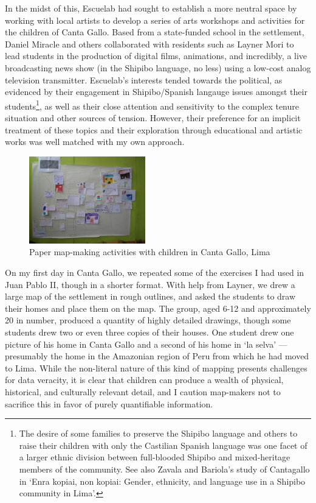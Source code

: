 \documentclass[11pt]{report}
\begin{document}
In the midst of this, Escuelab had sought to establish a more neutral space by working with local artists to develop a series of arts workshops and activities for the children of Canta Gallo. Based from a state-funded school in the settlement, Daniel Miracle and others collaborated with residents such as Layner Mori to lead students in the production of digital films, animations, and incredibly, a live broadcasting news show (in the Shipibo language, no less) using a low-cost analog television transmitter. Escuelab's interests tended towards the political, as evidenced by their engagement in Shipibo/Spanish langauge issues amongst their students\footnote{The desire of some families to preserve the Shipibo language and others to raise their children with only the Castilian Spanish language was one facet of a larger ethnic division between full-blooded Shipibo and mixed-heritage members of the community. See also Zavala and Bariola's study of Cantagallo in `Enra kopiai, non kopiai: Gender, ethnicity, and language use in a Shipibo community in Lima'.\cite{bariola2008gender}}, as well as their close attention and sensitivity to the complex tenure situation and other sources of tension. However, their preference for an implicit treatment of these topics and their exploration through educational and artistic works was well matched with my own approach.

\begin{figure}
	\begin{flushright}
		\includegraphics[width=0.45\textwidth]{images/canta-gallo-drawn-map.jpg}
		\caption{Paper map-making activities with children in Canta Gallo, Lima}
	\end{flushright}
\end{figure}

On my first day in Canta Gallo, we repeated some of the exercises I had used in Juan Pablo II, though in a shorter format. With help from Layner, we drew a large map of the settlement in rough outlines, and asked the students to draw their homes and place them on the map. The group, aged 6-12 and approximately 20 in number, produced a quantity of highly detailed drawings, though some students drew two or even three copies of their houses. One student drew one picture of his home in Canta Gallo and a second of his home in `la selva' --- presumably the home in the Amazonian region of Peru from which he had moved to Lima. While the non-literal nature of this kind of mapping presents challenges for data veracity, it is clear that children can produce a wealth of physical, historical, and culturally relevant detail, and I caution map-makers not to sacrifice this in favor of purely quantifiable information. 
\end{document}
